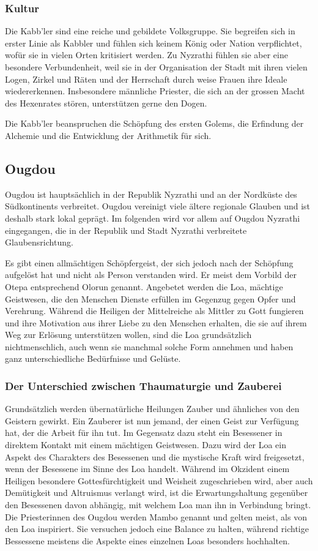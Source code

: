 \documentclass[12pt,twoside,twocolumn,openany]{book}
\begin{document}
\subsubsection{Kultur}
Die Kabb'ler sind eine reiche und gebildete Volksgruppe. Sie begreifen sich in erster Linie als Kabbler und fühlen sich keinem König oder Nation verpflichtet, wofür sie in vielen Orten kritisiert werden. Zu Nyzrathi fühlen sie aber eine besondere Verbundenheit, weil sie in der Organisation der Stadt mit ihren vielen Logen, Zirkel und Räten und der Herrschaft durch weise Frauen ihre Ideale wiedererkennen. Insbesondere  männliche Priester, die sich an der grossen Macht des Hexenrates stören, unterstützen gerne den Dogen.

Die Kabb'ler beanspruchen die Schöpfung des ersten Golems, die Erfindung der Alchemie und die Entwicklung der Arithmetik für sich.

\subsection{Ougdou}

Ougdou ist hauptsächlich in der Republik Nyzrathi und an der Nordküste des Südkontinents verbreitet. Ougdou vereinigt viele ältere regionale Glauben und ist deshalb stark lokal geprägt. Im folgenden wird vor allem auf Ougdou Nyzrathi eingegangen, die in der Republik und Stadt Nyzrathi verbreitete Glaubensrichtung.

Es gibt einen allmächtigen Schöpfergeist, der sich jedoch nach der Schöpfung aufgelöst hat und nicht als Person verstanden wird. Er meist dem Vorbild der Otepa entsprechend Olorun genannt. Angebetet werden die Loa, mächtige Geistwesen, die den Menschen Dienste erfüllen im Gegenzug gegen Opfer und Verehrung. Während die Heiligen der Mittelreiche als Mittler zu Gott fungieren und ihre Motivation aus ihrer Liebe zu den Menschen erhalten, die sie auf ihrem Weg zur Erlösung unterstützen wollen, sind die Loa grundsätzlich nichtmenschlich, auch wenn sie manchmal solche Form annehmen und haben ganz unterschiedliche Bedürfnisse und Gelüste.

\subsubsection{Der Unterschied zwischen Thaumaturgie und Zauberei}
Grundsätzlich werden übernatürliche Heilungen Zauber und ähnliches von den Geistern gewirkt. Ein Zauberer ist nun jemand, der einen Geist zur Verfügung hat, der die Arbeit für ihn tut. Im Gegensatz dazu steht ein Besessener in direktem Kontakt mit einem mächtigen Geistwesen. Dazu wird der Loa ein Aspekt des Charakters des Besessenen und die mystische Kraft wird freigesetzt, wenn der Besessene im Sinne des Loa handelt. Während im Okzident einem Heiligen besondere Gottesfürchtigkeit und Weisheit zugeschrieben wird, aber auch Demütigkeit und Altruismus verlangt wird, ist die Erwartungshaltung gegenüber den Besessenen davon abhängig, mit welchem Loa man ihn in Verbindung bringt. Die Priesterinnen des Ougdou werden Mambo genannt und gelten meist, als von den Loa inspiriert. Sie versuchen jedoch eine Balance zu halten, während richtige Bessessene meistens die Aspekte eines einzelnen Loas besonders hochhalten.
\end{document}
